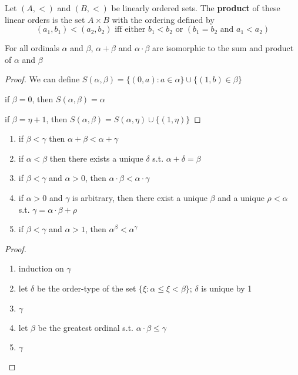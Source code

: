 \documentclass[11pt]{article}
\begin{document}
\begin{definition}[]
Let \((A,<)\) and \((B,<)\) be linearly ordered sets. The \textbf{product} of these linear orders is the
set \(A\times B\) with the ordering defined by
\begin{equation*}
(a_1,b_1)<(a_2,b_2)\text{ iff either }b_1<b_2\text{ or }(b_1=b_2\text{ and }a_1<a_2)
\end{equation*}
\end{definition}

\begin{lemma}[]
\label{Question2}
For all ordinals \(\alpha\) and \(\beta\), \(\alpha+\beta\) and \(\alpha\cdot\beta\) are isomorphic to the sum and product of \(\alpha\) and \(\beta\)
\end{lemma}

\begin{proof}
We can define \(S(\alpha,\beta)=\{(0,a):a\in\alpha\}\cup\{(1,b)\in\beta\}\)

if \(\beta=0\), then \(S(\alpha,\beta)=\alpha\)

if \(\beta=\eta+1\), then \(S(\alpha,\beta)=S(\alpha,\eta)\cup\{(1,\eta)\}\)
\end{proof}

\begin{lemma}[]
\label{lemma2.25}
\begin{enumerate}
\item if \(\beta<\gamma\) then \(\alpha+\beta<\alpha+\gamma\)
\item if \(\alpha<\beta\) then there exists a unique \(\delta\) s.t. \(\alpha+\delta=\beta\)
\item if \(\beta<\gamma\) and \(\alpha>0\), then \(\alpha\cdot\beta<\alpha\cdot\gamma\)
\item if \(\alpha>0\) and \(\gamma\) is arbitrary, then there exist a unique \(\beta\) and a unique \(\rho<\alpha\) s.t. \(\gamma=\alpha\cdot\beta+\rho\)
\item if \(\beta<\gamma\) and \(\alpha>1\), then \(\alpha^\beta<\alpha^\gamma\)
\end{enumerate}
\end{lemma}

\begin{proof}
\begin{enumerate}
\item induction on \(\gamma\)
\item let \(\delta\) be the order-type of the set \(\{\xi:\alpha\le\xi<\beta\}\); \(\delta\) is unique by 1
\item \(\gamma\)
\item let \(\beta\) be the greatest ordinal s.t. \(\alpha\cdot\beta\le\gamma\)
\item \(\gamma\)
\end{enumerate}
\end{proof}
\end{document}
